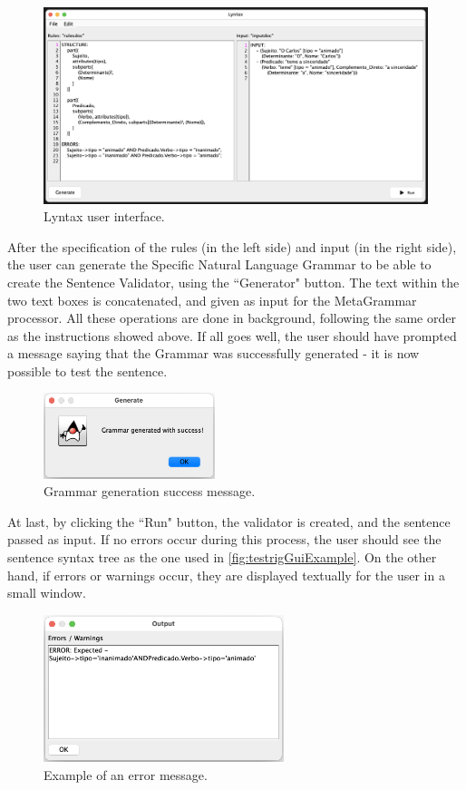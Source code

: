 \begin{figure}[h]
    \centering
    \includegraphics[width=14cm]{images/lyntax-gui.png}
    \caption{Lyntax user interface.}
    \label{fig:lyntaxGui}
\end{figure}

After the specification of the rules (in the left side) and input (in the right side), the user can generate the Specific Natural Language Grammar to be able to create the Sentence Validator,
using the ``Generator" button.
The text within the two text boxes is concatenated, and given as input for the MetaGrammar processor.
All these operations are done in background, following the same order as the instructions showed above.
If all goes well, the user should have prompted a message saying that the Grammar was successfully generated - it is now possible to test the sentence.

\begin{figure}[h]
    \centering
    \includegraphics[width=5cm]{images/grammar_gen_success.png}
    \caption{Grammar generation success message.}
    \label{fig:grammarGenSuccess}
\end{figure}

\newpage
At last, by clicking the ``Run" button, the validator is created, and the sentence passed as input.
If no errors occur during this process, the user should see the sentence syntax tree as the one used in \autoref{fig:testrigGuiExample}.
On the other hand, if errors or warnings occur, they are displayed textually for the user in a small window.

\begin{figure}[h]
    \centering
    \includegraphics[width=7cm]{images/lyntax_error_window.png}
    \caption{Example of an error message.}
    \label{fig:lyntaxErrorWindow}
\end{figure}


